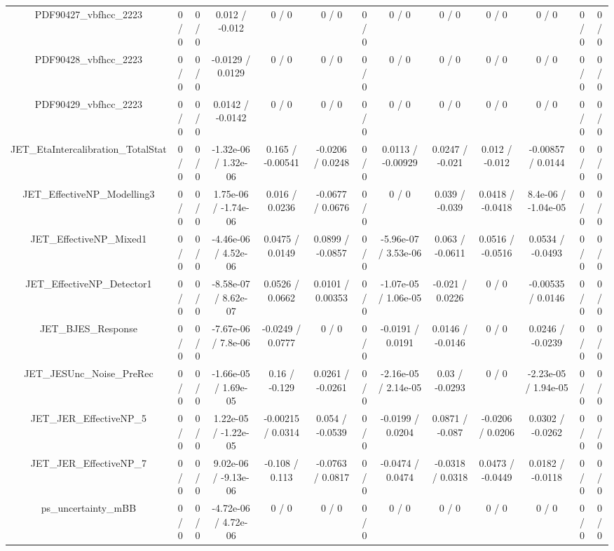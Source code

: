 \documentclass[10pt]{article}
\begin{document}
\begin{table}[htbp]
\begin{center}
\begin{tabular}{|c|c|c|c|c|c|c|c|c|c|c|c|c|}
  PDF90427_vbfhcc_2223 & 0 / 0 & 0 / 0 & 0.012 / -0.012 & 0 / 0 & 0 / 0 & 0 / 0 & 0 / 0 & 0 / 0 & 0 / 0 & 0 / 0 & 0 / 0 & 0 / 0 \\ 
  PDF90428_vbfhcc_2223 & 0 / 0 & 0 / 0 & -0.0129 / 0.0129 & 0 / 0 & 0 / 0 & 0 / 0 & 0 / 0 & 0 / 0 & 0 / 0 & 0 / 0 & 0 / 0 & 0 / 0 \\ 
  PDF90429_vbfhcc_2223 & 0 / 0 & 0 / 0 & 0.0142 / -0.0142 & 0 / 0 & 0 / 0 & 0 / 0 & 0 / 0 & 0 / 0 & 0 / 0 & 0 / 0 & 0 / 0 & 0 / 0 \\ 
  JET_EtaIntercalibration_TotalStat & 0 / 0 & 0 / 0 & -1.32e-06 / 1.32e-06 & 0.165 / -0.00541 & -0.0206 / 0.0248 & 0 / 0 & 0.0113 / -0.00929 & 0.0247 / -0.021 & 0.012 / -0.012 & -0.00857 / 0.0144 & 0 / 0 & 0 / 0 \\ 
  JET_EffectiveNP_Modelling3 & 0 / 0 & 0 / 0 & 1.75e-06 / -1.74e-06 & 0.016 / 0.0236 & -0.0677 / 0.0676 & 0 / 0 & 0 / 0 & 0.039 / -0.039 & 0.0418 / -0.0418 & 8.4e-06 / -1.04e-05 & 0 / 0 & 0 / 0 \\ 
  JET_EffectiveNP_Mixed1 & 0 / 0 & 0 / 0 & -4.46e-06 / 4.52e-06 & 0.0475 / 0.0149 & 0.0899 / -0.0857 & 0 / 0 & -5.96e-07 / 3.53e-06 & 0.063 / -0.0611 & 0.0516 / -0.0516 & 0.0534 / -0.0493 & 0 / 0 & 0 / 0 \\ 
  JET_EffectiveNP_Detector1 & 0 / 0 & 0 / 0 & -8.58e-07 / 8.62e-07 & 0.0526 / 0.0662 & 0.0101 / 0.00353 & 0 / 0 & -1.07e-05 / 1.06e-05 & -0.021 / 0.0226 & 0 / 0 & -0.00535 / 0.0146 & 0 / 0 & 0 / 0 \\ 
  JET_BJES_Response & 0 / 0 & 0 / 0 & -7.67e-06 / 7.8e-06 & -0.0249 / 0.0777 & 0 / 0 & 0 / 0 & -0.0191 / 0.0191 & 0.0146 / -0.0146 & 0 / 0 & 0.0246 / -0.0239 & 0 / 0 & 0 / 0 \\ 
  JET_JESUnc_Noise_PreRec & 0 / 0 & 0 / 0 & -1.66e-05 / 1.69e-05 & 0.16 / -0.129 & 0.0261 / -0.0261 & 0 / 0 & -2.16e-05 / 2.14e-05 & 0.03 / -0.0293 & 0 / 0 & -2.23e-05 / 1.94e-05 & 0 / 0 & 0 / 0 \\ 
  JET_JER_EffectiveNP_5 & 0 / 0 & 0 / 0 & 1.22e-05 / -1.22e-05 & -0.00215 / 0.0314 & 0.054 / -0.0539 & 0 / 0 & -0.0199 / 0.0204 & 0.0871 / -0.087 & -0.0206 / 0.0206 & 0.0302 / -0.0262 & 0 / 0 & 0 / 0 \\ 
  JET_JER_EffectiveNP_7 & 0 / 0 & 0 / 0 & 9.02e-06 / -9.13e-06 & -0.108 / 0.113 & -0.0763 / 0.0817 & 0 / 0 & -0.0474 / 0.0474 & -0.0318 / 0.0318 & 0.0473 / -0.0449 & 0.0182 / -0.0118 & 0 / 0 & 0 / 0 \\ 
  ps_uncertainty_mBB & 0 / 0 & 0 / 0 & -4.72e-06 / 4.72e-06 & 0 / 0 & 0 / 0 & 0 / 0 & 0 / 0 & 0 / 0 & 0 / 0 & 0 / 0 & 0 / 0 & 0 / 0 \\ 

\end{tabular}
\end{center}
\end{table}
\end{document}
